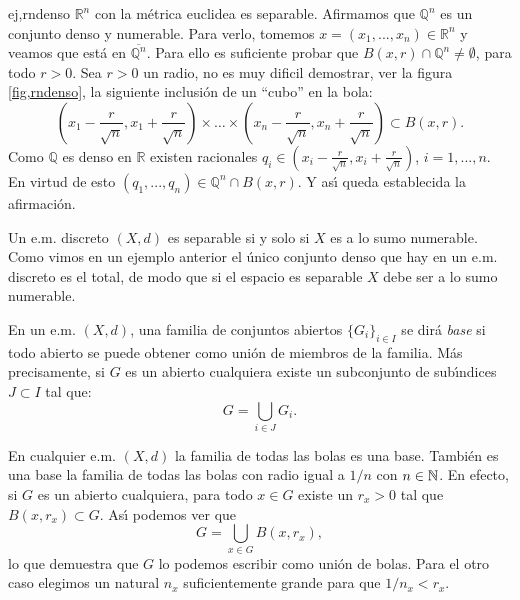 \begin{ejemplo}{ej,rndenso} $\mathbb{R}^n$ con la métrica euclidea es
separable. Afirmamos que $\mathbb{Q}^n$ es un conjunto denso y
numerable. Para verlo, tomemos $x=(x_1,...,x_n)\in \mathbb{R}^n$ y
veamos que está en $\overline{\mathbb{Q}^n}$. Para ello es
suficiente probar que $B(x,r)\cap \mathbb{Q}^n\neq\emptyset$, para
todo $r>0$. Sea $r>0$ un radio, no es muy dificil demostrar, ver
la figura \vref{fig,rndenso}, la siguiente inclusión de un
``cubo'' en la bola:
\[
    (x_1-\frac{r}{\sqrt{n}},x_1+\frac{r}{\sqrt{n}})\times\dots\times
    (x_n-\frac{r}{\sqrt{n}},x_n+\frac{r}{\sqrt{n}})\subset B(x,r).
\]
Como $\mathbb{Q}$ es denso en $\mathbb{R}$ existen racionales
$q_i\in (x_i-\frac{r}{\sqrt{n}},x_i+\frac{r}{\sqrt{n}})$,
$i=1,...,n$. En virtud de esto $(q_1,...,q_n)\in\mathbb{Q}^n\cap
B(x,r)$. Y as\'{\i} queda establecida la afirmación.


\end{ejemplo}

\begin{ejemplo}{} Un e.m. discreto $(X,d)$ es separable si y solo si
$X$ es a lo sumo numerable. Como vimos en un ejemplo anterior el
único conjunto denso que hay en un e.m. discreto es el total, de
modo que si el espacio es separable $X$ debe ser a lo sumo
numerable.
\end{ejemplo}

\begin{definicion}{} En un e.m. $(X,d)$, una familia de conjuntos
abiertos $\{G_i\}_{i\in I}$ se dirá \emph{base} si todo abierto
se puede obtener como unión de miembros de la familia. Más
precisamente, si $G$ es un abierto cualquiera existe un
subconjunto de sub\'{\i}ndices $J\subset I$ tal que:
\[
    G=\bigcup_{i\in J}G_i.
\]
\end{definicion}

\begin{ejemplo}{} En cualquier e.m. $(X,d)$ la familia de todas las
bolas es una base. También es una base la familia de todas las
bolas con radio igual a $1/n$ con $n\in \mathbb{N}$. En efecto, si $G$ es
un abierto cualquiera, para todo $x\in G$ existe un $r_x>0$ tal
que $B(x,r_x)\subset G$. As\'{\i} podemos ver que
\[
    G=\bigcup\limits_{x\in G}B(x,r_x),
\]
lo que demuestra que $G$ lo podemos escribir como unión de
bolas. Para el otro caso elegimos un natural $n_x$ suficientemente
grande para que $1/n_x<r_x$.
\end{ejemplo}

